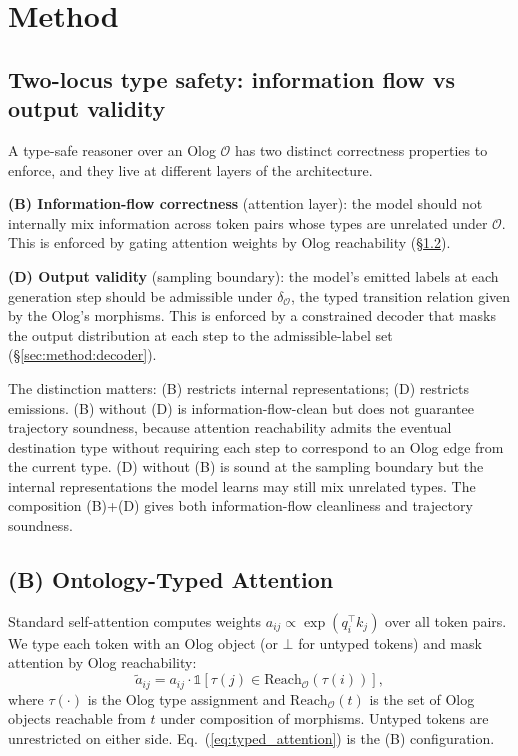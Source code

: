 \section{Method}
\label{sec:method}

\subsection{Two-locus type safety: information flow vs output validity}
\label{sec:method:two_loci}

A type-safe reasoner over an Olog $\mathcal{O}$ has two distinct correctness
properties to enforce, and they live at different layers of the
architecture.

\textbf{(B) Information-flow correctness} (attention layer): the model
should not internally mix information across token pairs whose types are
unrelated under $\mathcal{O}$. This is enforced by gating attention
weights by Olog reachability (\S\ref{sec:method:attention}).

\textbf{(D) Output validity} (sampling boundary): the model's emitted
labels at each generation step should be admissible under $\delta_\mathcal{O}$,
the typed transition relation given by the Olog's morphisms. This is
enforced by a constrained decoder that masks the output distribution at
each step to the admissible-label set (\S\ref{sec:method:decoder}).

The distinction matters: (B) restricts internal representations; (D)
restricts emissions. (B) without (D) is information-flow-clean but does
not guarantee trajectory soundness, because attention reachability admits
the eventual destination type without requiring each step to correspond
to an Olog edge from the current type. (D) without (B) is sound at the
sampling boundary but the internal representations the model learns may
still mix unrelated types. The composition (B)+(D) gives both
information-flow cleanliness and trajectory soundness.

\subsection{(B) Ontology-Typed Attention}
\label{sec:method:attention}

Standard self-attention computes weights $a_{ij} \propto \exp(q_i^\top
k_j)$ over all token pairs. We type each token with an Olog object (or
$\bot$ for untyped tokens) and mask attention by Olog reachability:
\begin{equation}
\tilde{a}_{ij} = a_{ij} \cdot \mathbb{1}[\tau(j) \in
\mathrm{Reach}_{\mathcal{O}}(\tau(i))],
\label{eq:typed_attention}
\end{equation}
where $\tau(\cdot)$ is the Olog type assignment and
$\mathrm{Reach}_{\mathcal{O}}(t)$ is the set of Olog objects reachable from
$t$ under composition of morphisms. Untyped tokens are unrestricted on
either side. Eq.~(\ref{eq:typed_attention}) is the (B) configuration.

